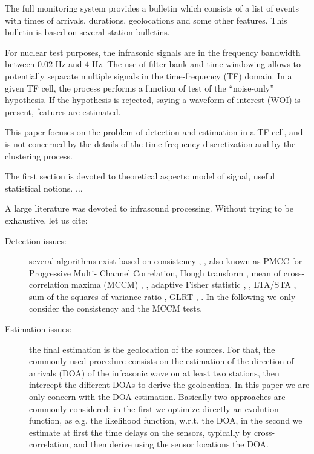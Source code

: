\documentclass[graybox]{svmult/styles/svmult}
\begin{document}
 
The full monitoring system provides a bulletin which consists of a list of events with times of arrivals, durations, geolocations and some other features. This bulletin is based on several station bulletins. 

For nuclear test purposes, the infrasonic signals are  in the frequency bandwidth  between $0.02$ Hz and $4$ Hz. The use of filter bank and time windowing allows to potentially separate multiple signals in the time-frequency (TF) domain. In a given TF cell, the  process  performs a function of test of the ``noise-only'' hypothesis. If the hypothesis is rejected, saying a waveform of interest (WOI) is present, features are estimated. 

This paper focuses on the problem of  detection and estimation in a TF cell, and is not concerned by the details of the time-frequency discretization and by the clustering process. 
 
{\color{red}The first section is devoted to theoretical aspects: model of signal, useful statistical notions. $\ldots$}
 
 A large literature was devoted to infrasound processing. Without trying to be exhaustive, let us cite:
 \begin{description}
 \item[Detection issues:]
 several algorithms exist based on consistency \cite{cansi1995}, \cite{runco:2014}, also known as PMCC for Progressive Multi- Channel Correlation,  Hough transform \cite{brown_automatic_2008},  mean of cross-correlation maxima (MCCM) \cite{wilson:2005bis}, \cite{mccmolson2013}, adaptive Fisher statistic \cite{arrowsmith2009}, \cite{shumway2006}, LTA/STA \cite{bungum1971}, sum of the squares of variance ratio \cite{lee2010}, GLRT \cite{shumway:2001}, \cite{charbit_egu:2013}. In the following we only consider the consistency and the MCCM tests.

 \item[Estimation issues:]
the final estimation is the geolocation of the sources. For that, the commonly used procedure consists on the estimation of the direction of arrivals (DOA) of the infrasonic wave on at least two stations, then intercept the different DOAs to derive the geolocation. In this paper we are only concern with the DOA estimation. Basically two approaches are commonly considered: in the first we optimize directly an evolution function, as e.g. the likelihood function, w.r.t. the DOA, in the second we estimate at first the time delays on the sensors, typically by cross-correlation, and then derive using the sensor locations the DOA.


 \end{description}
  
\end{document}
